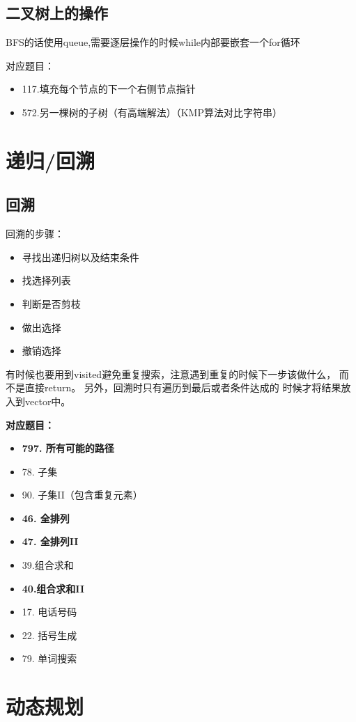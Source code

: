 \documentclass[a4paper,twoside]{ctexart}
\begin{document}
\subsection{二叉树上的操作}

BFS的话使用queue,需要逐层操作的时候while内部要嵌套一个for循环

对应题目：
\begin{itemize}
\item 117.填充每个节点的下一个右侧节点指针
\item 572.另一棵树的子树（有高端解法）（KMP算法对比字符串）
\end{itemize}

\section{递归/回溯}

\subsection{回溯}

回溯的步骤：
\begin{itemize}
\item 寻找出递归树以及结束条件
\item 找选择列表
\item 判断是否剪枝
\item 做出选择
\item 撤销选择
\end{itemize}

有时候也要用到visited避免重复搜索，注意遇到重复的时候下一步该做什么，
而不是直接return。 另外，回溯时只有遍历到最后或者条件达成的
时候才将结果放入到vector中。

\textbf{对应题目：}
\begin{itemize}
\item \textbf{797. 所有可能的路径}
\item 78. 子集
\item 90. 子集II（包含重复元素）
\item \textbf{46. 全排列}
\item \textbf{47. 全排列II}
\item 39.组合求和
\item \textbf{40.组合求和II}
\item 17. 电话号码
\item 22. 括号生成
\item 79. 单词搜索
\end{itemize}


\section{动态规划}
\end{document}

